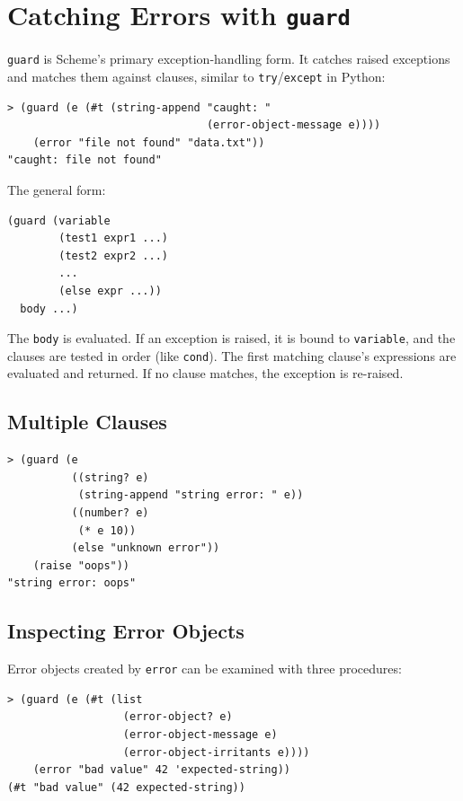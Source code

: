 \section{Catching Errors with \texttt{guard}}

\texttt{guard} is Scheme's primary exception-handling form. It catches raised exceptions and matches them against clauses, similar to \texttt{try}/\texttt{except} in Python:

\begin{lstlisting}[style=repl]
> (guard (e (#t (string-append "caught: "
                               (error-object-message e))))
    (error "file not found" "data.txt"))
"caught: file not found"
\end{lstlisting}

The general form:

\begin{lstlisting}
(guard (variable
        (test1 expr1 ...)
        (test2 expr2 ...)
        ...
        (else expr ...))
  body ...)
\end{lstlisting}

The \texttt{body} is evaluated. If an exception is raised, it is bound to \texttt{variable}, and the clauses are tested in order (like \texttt{cond}). The first matching clause's expressions are evaluated and returned. If no clause matches, the exception is re-raised.

\subsection{Multiple Clauses}

\begin{lstlisting}[style=repl]
> (guard (e
          ((string? e)
           (string-append "string error: " e))
          ((number? e)
           (* e 10))
          (else "unknown error"))
    (raise "oops"))
"string error: oops"
\end{lstlisting}

\subsection{Inspecting Error Objects}

Error objects created by \texttt{error} can be examined with three procedures:

\begin{lstlisting}[style=repl]
> (guard (e (#t (list
                  (error-object? e)
                  (error-object-message e)
                  (error-object-irritants e))))
    (error "bad value" 42 'expected-string))
(#t "bad value" (42 expected-string))
\end{lstlisting}

